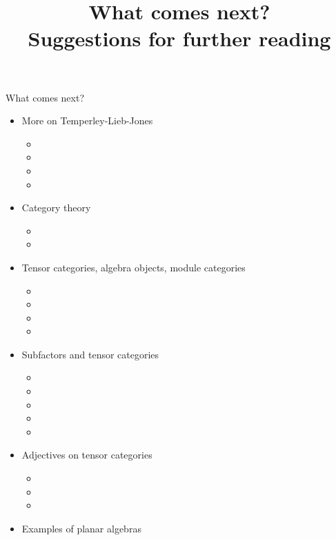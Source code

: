 \documentclass[12pt]{amsart}
\title{What comes next? \\ Suggestions for further reading}
\begin{document}
\maketitle

What comes next?



\begin{itemize}
\item More on Temperley-Lieb-Jones
  \begin{itemize}
  \item {}
  \item {}
  \item {}
  \item {}
  \end{itemize}
\item Category theory
  \begin{itemize}
  \item {}
  \item {}
  \end{itemize}
\item Tensor categories, algebra objects, module categories
	\begin{itemize}	
	\item {}
	\item {}
  \item {}
	\item {}
	\end{itemize}
\item Subfactors and tensor categories
  \begin{itemize}
  \item {}
  \item {}
  \item {}
  \item {}
  \item {}
  \end{itemize}
\item Adjectives on tensor categories
  \begin{itemize}
  \item {}
  \item {}
  \item {}
  \end{itemize}
\item Examples of planar algebras

\end{itemize}
\end{document}
